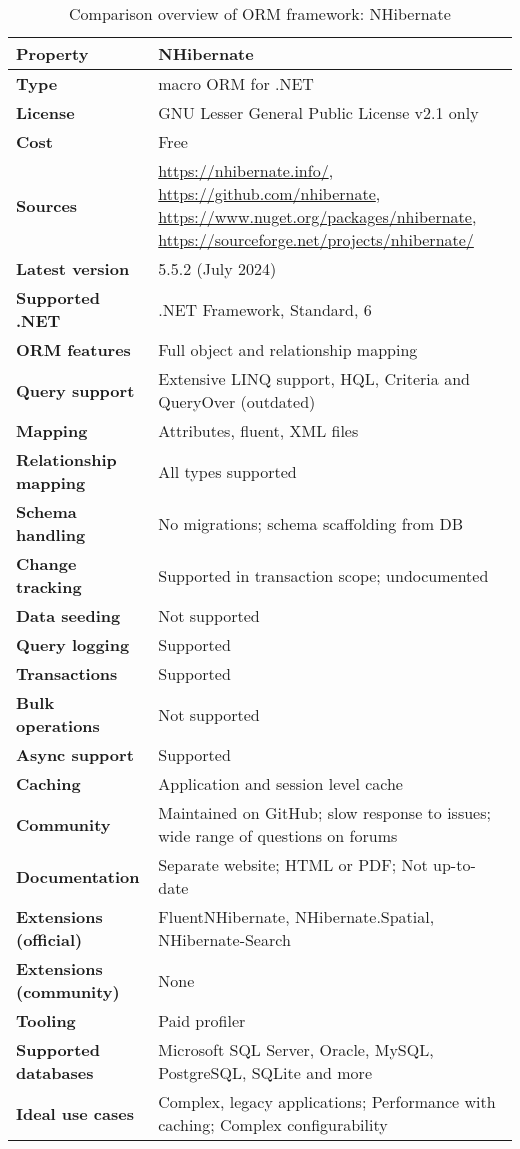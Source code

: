 \begin{table}[H]
\centering
\caption{Comparison overview of ORM framework: NHibernate}
\begin{tabular}{|l|l|}
\toprule
\textbf{Property} & \textbf{NHibernate} \\
\midrule
\textbf{Type} & macro ORM for .NET \\
\textbf{License} & GNU Lesser General Public License v2.1 only \\
\textbf{Cost} & Free \\
\textbf{Sources} & \url{https://nhibernate.info/}, \url{https://github.com/nhibernate}, \url{https://www.nuget.org/packages/nhibernate}, \url{https://sourceforge.net/projects/nhibernate/}  \\
\textbf{Latest version} & 5.5.2 (July 2024) \\
\textbf{Supported .NET} & .NET Framework, Standard, 6 \\
\textbf{ORM features} & Full object and relationship mapping \\
\textbf{Query support} & Extensive LINQ support, HQL, Criteria and QueryOver (outdated) \\
\textbf{Mapping} & Attributes, fluent, XML files \\
\textbf{Relationship mapping} & All types supported \\
\textbf{Schema handling} & No migrations; schema scaffolding from DB \\
\textbf{Change tracking} & Supported in transaction scope; undocumented \\
\textbf{Data seeding} & Not supported \\
\textbf{Query logging} & Supported \\
\textbf{Transactions} & Supported \\
\textbf{Bulk operations} & Not supported \\
\textbf{Async support} & Supported \\
\textbf{Caching} & Application and session level cache \\
\textbf{Community} & Maintained on GitHub; slow response to issues; wide range of questions on forums \\
\textbf{Documentation} & Separate website; HTML or PDF; Not up-to-date\\
\textbf{Extensions (official)} & FluentNHibernate, NHibernate.Spatial, NHibernate-Search  \\
\textbf{Extensions (community)} & None \\
\textbf{Tooling} & Paid profiler \\
\textbf{Supported databases} & Microsoft SQL Server, Oracle, MySQL, PostgreSQL, SQLite and more  \\
\textbf{Ideal use cases} & Complex, legacy applications; Performance with caching; Complex configurability \\
\bottomrule
\end{tabular}
\end{table}

